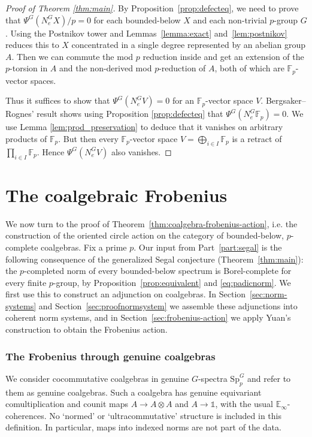 \documentclass[11pt,a4paper]{article}
\newcommand{\mathbbm}[1]{\mathds{#1}}
\theoremstyle{definition}
\newcommand{\Sp}{\mathrm{Sp}}
\newcommand{\Fp}{\mathbb F_p}
\newcommand{\NormG}{N_e^G}
\begin{document}
\begin{proof}[Proof of Theorem \ref{thm:main}]
By Proposition~\ref{prop:defecteq}, we need to prove that  $\Psi^G(\NormG X) / p = 0$ for each bounded-below $X$ and each non-trivial $p$-group $G$. Using the Postnikov tower and Lemmas~\ref{lemma:exact} and~\ref{lem:postnikov} reduces this to $X$ concentrated in a single degree represented by an abelian group $A$. Then we can commute the mod $p$ reduction inside and get an extension of the $p$-torsion in $A$ and the non-derived mod $p$-reduction of $A$, both of which are $\Fp$-vector spaces. 

Thus it suffices to show that $\Psi^G(\NormG V)= 0$ for an $\Fp$-vector space $V$. 
Bergsaker--Rognes' result \cite[Theorem 1.1]{BR} shows using Proposition \ref{prop:defecteq} that $\Psi^G(\NormG \Fp) = 0$.  We use Lemma \ref{lem:prod_preservation} to deduce that it vanishes on arbitrary products of $\Fp$. But then every $\Fp$-vector space $V = \bigoplus_{i \in I} \Fp$ is a retract of $\prod_{i \in I} \Fp$. Hence $\Psi^G(\NormG V)$ also vanishes. 
\end{proof}

\part{The coalgebraic Frobenius}\label{part:frobenius}

We now turn to the proof of Theorem~\ref{thm:coalgebra-frobenius-action}, i.e. the construction of the oriented circle action on the category of bounded-below, $p$-complete coalgebras.
Fix a prime $p$. Our input from Part~\ref{part:segal} is the following
consequence of the generalized Segal conjecture (Theorem~\ref{thm:main}):
the $p$-completed norm of every bounded-below spectrum is
Borel-complete for every finite $p$-group, by
Proposition~\ref{prop:equivalent} and \eqref{eq:padicnorm}.
We first use this to construct an adjunction on coalgebras.
In Section~\ref{sec:norm-systems} and Section~\ref{sec:proofnormsystem} we assemble these adjunctions into
coherent norm systems, and in Section~\ref{sec:frobenius-action}
we apply Yuan's construction to obtain the Frobenius action. 

\section{The Frobenius through genuine coalgebras}\label{sec:adjunction}


We consider cocommutative coalgebras in genuine $G$-spectra $\Sp_p^G$ and refer to them as genuine coalgebras. Such a coalgebra has genuine equivariant
comultiplication and counit maps
$A\to A\otimes A$ and $A\to\mathbbm{1}$, with the usual
$\mathbb{E}_\infty$-coherences. No `normed' or `ultracommutative' structure
is included in this definition. In particular, maps into indexed norms
are not part of the data. %
\end{document}
